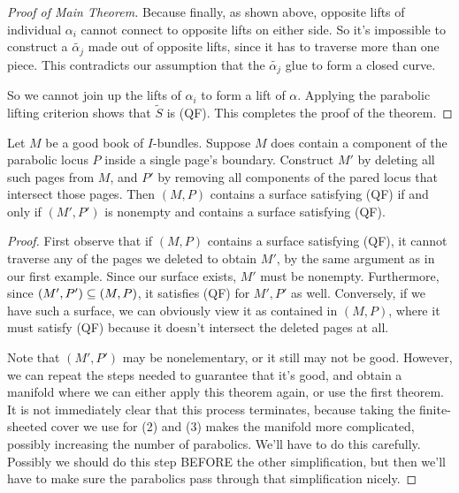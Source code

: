 \begin{proof}[Proof of Main Theorem]
Because finally, as shown above, opposite lifts of individual $\alpha_i$ cannot
connect to opposite lifts on either side. So it's impossible to construct
a $\widetilde{\alpha_j}$ made out of opposite lifts, since it has to traverse
more than one piece.  This contradicts our assumption that the
$\widetilde{\alpha_j}$ glue to form a closed curve.

So we cannot join up the lifts of $\alpha_i$ to form a lift of $\alpha$.
Applying the parabolic lifting criterion shows that $\widetilde{S}$ is (QF).
This completes the proof of the theorem.

\end{proof}

\begin{thm}

Let $M$ be a good book of $I$-bundles.  Suppose $M$ does contain a component of
the parabolic locus $P$ inside a single page's boundary.  Construct $M'$ by
deleting all such pages from $M$, and $P'$ by removing all components of the
pared locus that intersect those pages. Then $(M,P)$ contains a surface
satisfying (QF) if and only if $(M',P')$ is nonempty and contains
a surface satisfying (QF).

\end{thm}

\begin{proof}

First observe that if $(M,P)$ contains a surface satisfying (QF), it cannot
traverse any of the pages we deleted to obtain $M'$, by the same argument as in
our first example.  Since our surface exists, $M'$ must be nonempty.
Furthermore, since $(M',P') \subseteq (M,P)$, it satisfies (QF) for $M',P'$ as well.
Conversely, if we have such a surface, we can obviously view it as contained in
$(M,P)$, where it must satisfy (QF) because it doesn't intersect the deleted
pages at all.

Note that $(M',P')$ may be nonelementary, or it still may not be good.
However, we can repeat the steps needed to guarantee that it's good, and obtain
a manifold where we can either apply this theorem again, or use the first
theorem. It is not immediately clear that this process terminates, because
taking the finite-sheeted cover we use for (2) and (3) makes the manifold more
complicated, possibly increasing the number of parabolics. We'll have to do
this carefully. Possibly we should do this step BEFORE the other
simplification, but then we'll have to make sure the parabolics pass through
that simplification nicely.

\end{proof}

